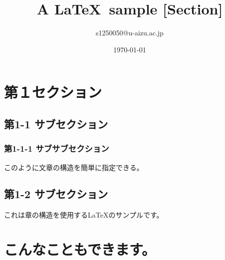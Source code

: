 ﻿\documentclass[a4paper]{jarticle}
\title{A \LaTeX ~sample [Section]}
\author{s1250050@u-aizu.ac.jp}
\date{\today}
\begin{document}
\maketitle
\section{第１セクション}
\subsection{第1-1 サブセクション}
\subsubsection{第1-1-1 サブサブセクション}
このように文章の構造を簡単に指定できる。
\subsection{第1-2 サブセクション}
これは章の構造を使用する\LaTeX のサンプルです。
\section*{こんなこともできます。}
\end{document}
